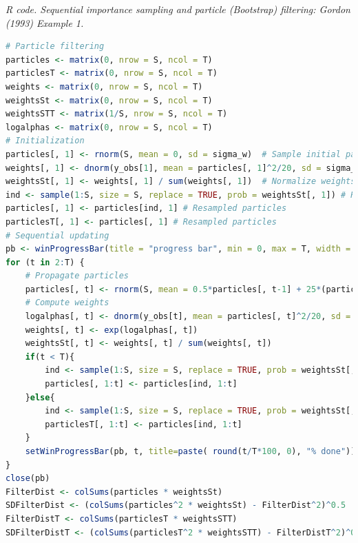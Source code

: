 \begin{enumerate}[leftmargin=*]
\begin{tcolorbox}[enhanced,width=4.67in,center upper,
	fontupper=\large\bfseries,drop shadow southwest,sharp corners]
	\textit{R code. Sequential importance sampling and particle (Bootstrap) filtering: Gordon (1993) Example 1.}
	\begin{VF}
		\begin{lstlisting}[language=R]
# Particle filtering
particles <- matrix(0, nrow = S, ncol = T) 
particlesT <- matrix(0, nrow = S, ncol = T)
weights <- matrix(0, nrow = S, ncol = T) 
weightsSt <- matrix(0, nrow = S, ncol = T) 
weightsSTT <- matrix(1/S, nrow = S, ncol = T) 
logalphas <- matrix(0, nrow = S, ncol = T) 
# Initialization
particles[, 1] <- rnorm(S, mean = 0, sd = sigma_w)  # Sample initial particles
weights[, 1] <- dnorm(y_obs[1], mean = particles[, 1]^2/20, sd = sigma_mu)  # Importance weights
weightsSt[, 1] <- weights[, 1] / sum(weights[, 1])  # Normalize weights
ind <- sample(1:S, size = S, replace = TRUE, prob = weightsSt[, 1]) # Resample 
particles[, 1] <- particles[ind, 1] # Resampled particles
particlesT[, 1] <- particles[, 1] # Resampled particles
# Sequential updating
pb <- winProgressBar(title = "progress bar", min = 0, max = T, width = 300)
for (t in 2:T) {
	# Propagate particles
	particles[, t] <- rnorm(S, mean = 0.5*particles[, t-1] + 25*(particles[, t-1]/(1+particles[, t-1]^2)) + 8*cos(1.2*t), sd = sigma_w)
	# Compute weights
	logalphas[, t] <- dnorm(y_obs[t], mean = particles[, t]^2/20, sd = sigma_mu, log = TRUE) 
	weights[, t] <- exp(logalphas[, t])
	weightsSt[, t] <- weights[, t] / sum(weights[, t])
	if(t < T){
		ind <- sample(1:S, size = S, replace = TRUE, prob = weightsSt[, t])
		particles[, 1:t] <- particles[ind, 1:t]
	}else{
		ind <- sample(1:S, size = S, replace = TRUE, prob = weightsSt[, t])
		particlesT[, 1:t] <- particles[ind, 1:t]
	}
	setWinProgressBar(pb, t, title=paste( round(t/T*100, 0), "% done"))
}
close(pb)
FilterDist <- colSums(particles * weightsSt)
SDFilterDist <- (colSums(particles^2 * weightsSt) - FilterDist^2)^0.5
FilterDistT <- colSums(particlesT * weightsSTT)
SDFilterDistT <- (colSums(particlesT^2 * weightsSTT) - FilterDistT^2)^0.5
\end{lstlisting}
	\end{VF}
\end{tcolorbox}  


\end{enumerate}
